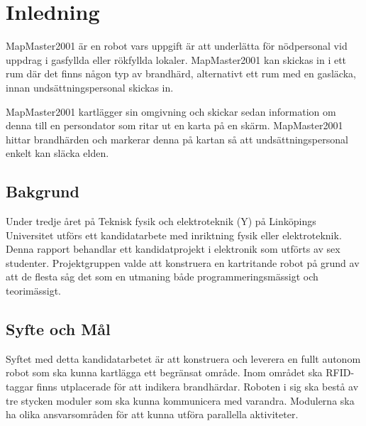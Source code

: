 \documentclass[a4paper,12pt,fleqn]{article}
\begin{document}

\thispagestyle{empty}
\addto\captionsswedish{\renewcommand{\contentsname}{Innehållsförteckning}}

\pagestyle{empty}
\tableofcontents
\cleardoublepage
\newpage
\listoffigures
\newpage

\pagestyle{fancy}



\section{Inledning} 
MapMaster2001 är en robot vars uppgift är att underlätta för nödpersonal vid uppdrag i gasfyllda eller rökfyllda lokaler. MapMaster2001 kan skickas in i ett rum där det finns någon typ av brandhärd, alternativt ett rum med en gasläcka, innan undsättningspersonal skickas in. 

MapMaster2001 kartlägger sin omgivning och skickar sedan information om denna till en persondator som ritar ut en karta på en skärm. MapMaster2001 hittar brandhärden och markerar denna på kartan så att undsättningspersonal enkelt kan släcka elden. 

\subsection{Bakgrund}
Under tredje året på Teknisk fysik och elektroteknik (Y) på Linköpings Universitet utförs ett kandidatarbete
med inriktning fysik eller elektroteknik. Denna rapport behandlar ett kandidatprojekt i elektronik som utförts av sex studenter. Projektgruppen valde att konstruera en kartritande robot på grund av att de flesta såg det som en utmaning både programmeringsmässigt och teorimässigt.

\subsection{Syfte och Mål}
Syftet med detta kandidatarbetet är att konstruera och leverera en fullt autonom robot som ska kunna kartlägga ett begränsat område. Inom området ska RFID-taggar finns utplacerade för att indikera brandhärdar. Roboten i sig ska bestå av tre stycken moduler som ska kunna kommunicera med varandra. Modulerna ska ha olika ansvarsområden för att kunna utföra parallella aktiviteter. 
\end{document}
